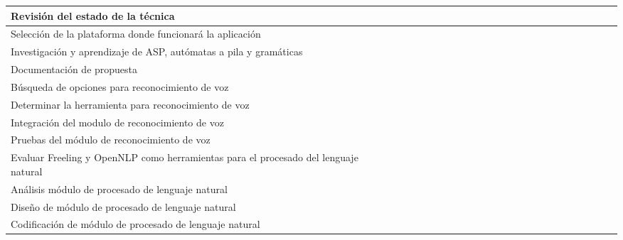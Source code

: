 \begin{table}
{\begin{tabular}{|p{4cm}|c|c|c|c|c|c|c|c|c|c|c|c|c|c|c|c|c|c|c|c|c|c|c|c}
	Revisión del estado de la técnica&\checkmark 
	&\checkmark  &\checkmark  &\checkmark  &\checkmark  &\checkmark  &  &  &  &  &  &  &  &  &  &  &  &  &  &  &  &  &\\  
	\hline 
	Selección de la plataforma donde funcionará la aplicación&  &  &  &\checkmark  &\checkmark  &\checkmark  &  &  &  &  &  &  &  &  &  &  &  &  &  &  &  &  &\\ 
	\hline 
	Investigación y aprendizaje de ASP, autómatas a pila y gramáticas&  &  &\checkmark  &\checkmark  &\checkmark  &\checkmark  &\checkmark  &\checkmark  &\checkmark  &\checkmark  &\checkmark  &\checkmark  &  &  &  &  &  &  &  &  &  &  &\\ 
	\hline 
	Documentación de propuesta&  &  &  &  &\checkmark  &\checkmark  &\checkmark  &\checkmark  &\checkmark  &\checkmark  &\checkmark  &\checkmark  &\checkmark  &\checkmark  &\checkmark  &\checkmark  &\checkmark  &\checkmark  &\checkmark  &\checkmark  &\checkmark  &\checkmark  &\checkmark\\ 
	\hline 
	Búsqueda de opciones para reconocimiento de voz&  &  &  &  &\checkmark  &\checkmark  &\checkmark  &  &  &  &  &  &  &  &  &  &  &  &  &  &  &  &\\ 
	\hline 
	Determinar la herramienta para reconocimiento de voz&  &  &  &  &\checkmark  &\checkmark  &  &  &  &  &  &  &  &  &  &  &  &  &  &  &  &  &\\ 
	\hline 
	Integración del modulo de reconocimiento de voz&  &  &  &  &  &\checkmark  &\checkmark  &  &  &  &  &  &  &  &  &  &  &  &  &  &  &  &\\ 
	\hline 
	Pruebas del módulo de reconocimiento de voz&  &  &  &  &  &  &  &\checkmark  &  &  &  &  &  &  &  &  &  &  &  &  &  &  &\\ 
	\hline  
	Evaluar Freeling y OpenNLP como herramientas para el procesado del lenguaje natural&  &  &  &  &  &  &  &  &\checkmark  &  &  &  &  &  &  &  &  &  &  &  &  &  &\\ 
	 \hline 
	Análisis módulo de procesado de lenguaje natural&  &  &  &  &  &  &  &  &   &\checkmark  &\checkmark  &\checkmark  &  &  &  &  &  &  &  &  &  &  &\\ 
	\hline
	Diseño de módulo de procesado de lenguaje natural&  &  &  &  &  &  &  &  &   &  &  &  & \checkmark &\checkmark  &\checkmark  &  &  &  &  &  &  &  &\\ 
	\hline  
	Codificación de módulo de procesado de lenguaje natural&  &  &  &  &  &  &  &  &   &  &  &  &  &  &  &\checkmark  &\checkmark  &\checkmark  &  &  &  &  &\\ 

\end{tabular}}
\end{table}
